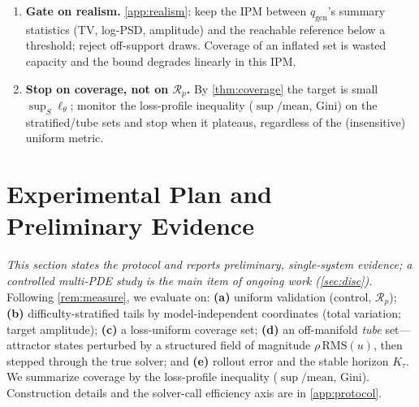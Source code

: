 \documentclass{article}
\theoremstyle{plain}
\theoremstyle{definition}
\theoremstyle{remark}
\newcommand{\state}{u}
\newcommand{\lossf}{\ell_\theta}
\newcommand{\pnat}{p}
\newcommand{\qgen}{q_{\mathrm{gen}}}
\newcommand{\Rp}{\mathcal{R}_{\pnat}}
\begin{document}
\begin{enumerate}[label=\textbf{P\arabic*.},leftmargin=2.6em,topsep=3pt,itemsep=3pt]
fixed point $\rho^\star$; do not fix $\rho$ a priori.
\item \textbf{Gate on realism.} \cref{app:realism}: keep the IPM between $\qgen$'s summary statistics
(TV, log-PSD, amplitude) and the reachable reference below a threshold; reject off-support draws. Coverage
of an inflated set is wasted capacity and the bound degrades linearly in this IPM.
\item \textbf{Stop on coverage, not on $\Rp$.} By \cref{thm:coverage} the target is small $\sup_S\lossf$;
monitor the loss-profile inequality ($\sup/\mathrm{mean}$, Gini) on the stratified/tube sets and stop when
it plateaus, regardless of the (insensitive) uniform metric.
\end{enumerate}

\section{Experimental Plan and Preliminary Evidence}\label{sec:exp}
\emph{This section states the protocol and reports preliminary, single-system evidence; a controlled
multi-PDE study is the main item of ongoing work (\cref{sec:disc}).} Following \cref{rem:measure}, we
evaluate on: \textbf{(a)} uniform validation (control, $\Rp$); \textbf{(b)} difficulty-stratified tails
by model-independent coordinates (total variation; target amplitude); \textbf{(c)} a loss-uniform
coverage set; \textbf{(d)} an off-manifold \emph{tube} set---attractor states perturbed by a structured
field of magnitude $\rho\,\mathrm{RMS}(\state)$, then stepped through the true solver; and \textbf{(e)}
rollout error and the stable horizon $K_\tau$. We summarize coverage by the loss-profile inequality
($\sup/\mathrm{mean}$, Gini). Construction details and the solver-call efficiency axis are in
\cref{app:protocol}.
\end{document}
